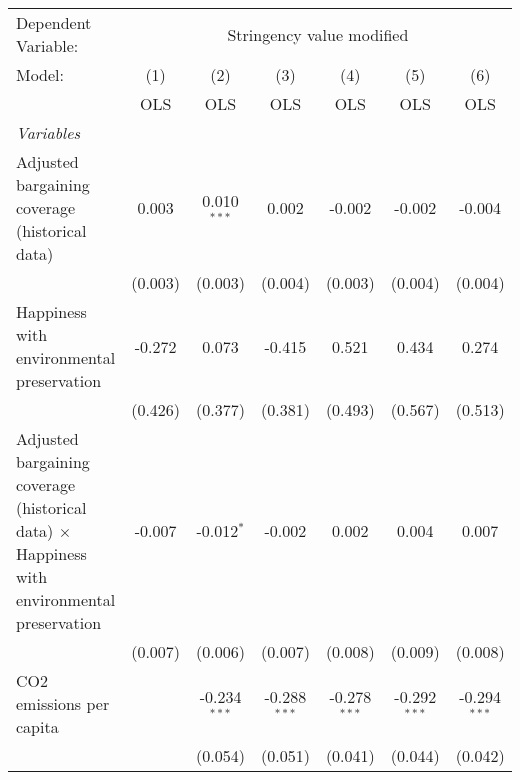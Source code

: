
\begingroup
\centering
\begin{tabular}{lcccccc}
   \toprule
   Dependent Variable: & \multicolumn{6}{c}{Stringency value modified}\\
   Model:                                                                                             & (1)     & (2)            & (3)            & (4)            & (5)            & (6)\\  
                                                                                                      &  OLS    & OLS            & OLS            & OLS            & OLS            & OLS\\  
   \midrule
   \emph{Variables}\\
   Adjusted bargaining coverage (historical data)                                                     & 0.003   & 0.010$^{***}$  & 0.002          & -0.002         & -0.002         & -0.004\\   
                                                                                                      & (0.003) & (0.003)        & (0.004)        & (0.003)        & (0.004)        & (0.004)\\   
   Happiness with environmental preservation                                                          & -0.272  & 0.073          & -0.415         & 0.521          & 0.434          & 0.274\\   
                                                                                                      & (0.426) & (0.377)        & (0.381)        & (0.493)        & (0.567)        & (0.513)\\   
   Adjusted bargaining coverage (historical data) $\times$ Happiness with environmental preservation  & -0.007  & -0.012$^{*}$   & -0.002         & 0.002          & 0.004          & 0.007\\   
                                                                                                      & (0.007) & (0.006)        & (0.007)        & (0.008)        & (0.009)        & (0.008)\\   
   CO2 emissions per capita                                                                           &         & -0.234$^{***}$ & -0.288$^{***}$ & -0.278$^{***}$ & -0.292$^{***}$ & -0.294$^{***}$\\   
                                                                                                      &         & (0.054)        & (0.051)        & (0.041)        & (0.044)        & (0.042)\\   

\end{tabular}
